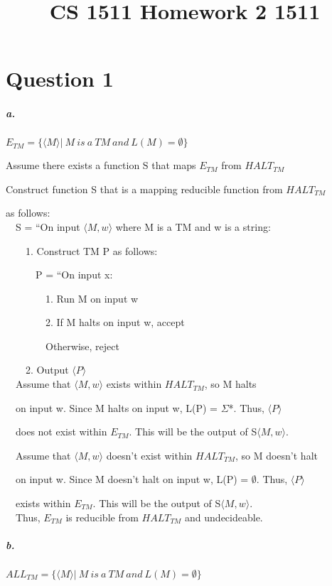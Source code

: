 \documentclass[12pt]{article}
\begin{document}
\title{CS 1511 Homework 2 1511}

\maketitle

\section{Question 1}
\subparagraph{a.}
$E_{TM} = \{\langle M\rangle |\ M\ is\ a\ TM\ and\ L(M) = \emptyset\}$

Assume there exists a function S that maps $E_{TM}$ from $HALT_{TM}$

Construct function S that is a mapping reducible function from $HALT_{TM}$

 as follows:\\[.15in]
$\quad$S = ``On input $\langle M, w\rangle$ where M is a TM and w is a string:

$\quad\quad$1. Construct TM P as follows:

$\quad\quad\quad$P = ``On input x:

$\quad\quad\quad\quad$1. Run M on input w

$\quad\quad\quad\quad$2. If M halts on input w, accept

$\quad\quad\quad\quad$Otherwise, reject

$\quad\quad$2. Output $\langle P\rangle$\\[.04in]

$\quad$Assume that $\langle M, w\rangle$ exists within $HALT_{TM}$, so M halts

$\quad$on input w. Since M halts on input w, L(P) = $\Sigma$*. Thus, $\langle P\rangle$

$\quad$does not exist within $E_{TM}$. This will be the output of S$\langle M, w\rangle$.

$\quad$Assume that $\langle M, w\rangle$ doesn't exist within $HALT_{TM}$, so M doesn't halt

$\quad$on input w. Since M doesn't halt on input w, L(P) = $\emptyset$. Thus, $\langle P\rangle$

$\quad$exists within $E_{TM}$. This will be the output of S$\langle M, w\rangle$.\\[.04in]

$\quad$Thus, $E_{TM}$ is reducible from $HALT_{TM}$ and undecideable.

\subparagraph{b.}
$ALL_{TM} = \{\langle M\rangle |\ M\ is\ a\ TM\ and\ L(M) = \emptyset\}$
\end{document}
